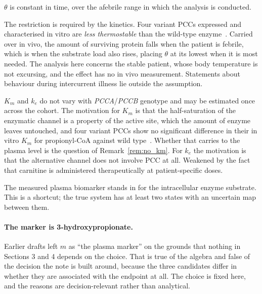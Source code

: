 \begin{assumption}[Constancy]
$\theta$ is constant in time, over the afebrile range in which the analysis is conducted.

The restriction is required by the kinetics. Four variant PCCs expressed and characterised
in vitro are \emph{less thermostable} than the wild-type
enzyme~\cite{pcc_variants_kinetics}. %
Carried over in vivo, the amount of surviving protein falls when the patient is febrile,
which is when the substrate load also rises, placing $\theta$ at its lowest when it is most
needed. The analysis here concerns the stable patient, whose body temperature is not
excursing, and the effect has no in vivo measurement. Statements about behaviour during
intercurrent illness lie outside the assumption.
\end{assumption}

\begin{assumption}
\label{ass:pop}
$K_m$ and $k_e$ do not vary with \emph{PCCA}/\emph{PCCB} genotype and may be estimated
once across the cohort. The motivation for $K_m$ is that the half-saturation of the
enzymatic channel is a property of the active site, which the amount of enzyme leaves
untouched, and four variant PCCs show no significant difference in their in vitro $K_m$
for propionyl-CoA against wild type~\cite{pcc_variants_kinetics}. %
Whether that carries to the plasma level is the question of Remark~\ref{rem:no_km}. For
$k_e$ the motivation is that the alternative channel does not involve PCC at all. %
Weakened by the fact that carnitine is
administered therapeutically at patient-specific doses.
\end{assumption}

\begin{assumption}
The measured plasma biomarker stands in for the intracellular enzyme substrate. This is a
shortcut; the true system has at least two states with an uncertain map between them.
\end{assumption}

\paragraph{The marker is 3-hydroxypropionate.}
\label{sec:marker}
Earlier drafts left $m$ as ``the plasma marker'' on the grounds that nothing in Sections 3
and 4 depends on the choice. That is true of the algebra and false of the decision the note
is built around, because the three candidates differ in whether they are associated with the
endpoint at all. The choice is fixed here, and the reasons are decision-relevant rather than
analytical.

